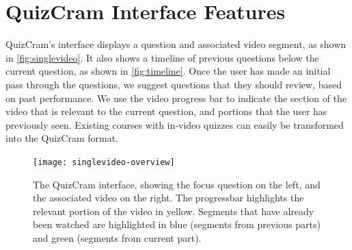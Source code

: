 \documentclass{sigchi}
\begin{document}
\section{QuizCram Interface Features}


QuizCram's interface displays a question and associated video segment, as shown in \autoref{fig:singlevideo}. It also shows a timeline of previous questions below the current question, as shown in \autoref{fig:timeline}. Once the user has made an initial pass through the questions, we suggest questions that they should review, based on past performance. We use the video progress bar to indicate the section of the video that is relevant to the current question, and portions that the user has previously seen. Existing courses with in-video quizzes can easily be transformed into the QuizCram format. 


\begin{figure}
\centering
\texttt{[image: singlevideo-overview]}
\caption{The QuizCram interface, showing the focus question on the left, and the associated video on the right. The progressbar highlights the relevant portion of the video in yellow. Segments that have already been watched are highlighted in blue (segments from previous parts) and green (segments from current part).}
\label{fig:singlevideo}
\end{figure}
\end{document}
